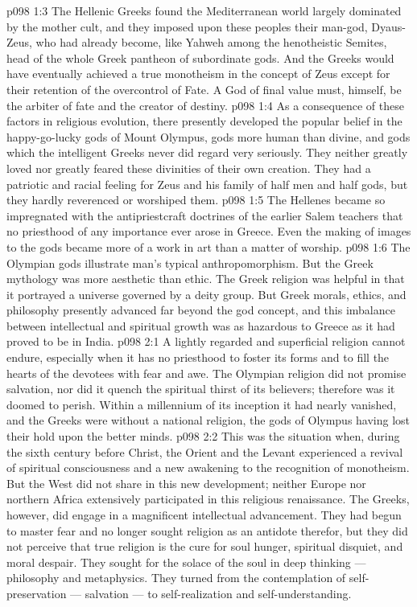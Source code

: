 \vs p098 1:3 The Hellenic Greeks found the Mediterranean world largely dominated by the mother cult, and they imposed upon these peoples their man\hyp{}god, Dyaus\hyp{}Zeus, who had already become, like Yahweh among the henotheistic Semites, head of the whole Greek pantheon of subordinate gods. And the Greeks would have eventually achieved a true monotheism in the concept of Zeus except for their retention of the overcontrol of Fate. A God of final value must, himself, be the arbiter of fate and the creator of destiny.
\vs p098 1:4 As a consequence of these factors in religious evolution, there presently developed the popular belief in the happy\hyp{}go\hyp{}lucky gods of Mount Olympus, gods more human than divine, and gods which the intelligent Greeks never did regard very seriously. They neither greatly loved nor greatly feared these divinities of their own creation. They had a patriotic and racial feeling for Zeus and his family of half men and half gods, but they hardly reverenced or worshiped them.
\vs p098 1:5 The Hellenes became so impregnated with the antipriestcraft doctrines of the earlier Salem teachers that no priesthood of any importance ever arose in Greece. Even the making of images to the gods became more of a work in art than a matter of worship.
\vs p098 1:6 The Olympian gods illustrate man’s typical anthropomorphism. But the Greek mythology was more aesthetic than ethic. The Greek religion was helpful in that it portrayed a universe governed by a deity group. But Greek morals, ethics, and philosophy presently advanced far beyond the god concept, and this imbalance between intellectual and spiritual growth was as hazardous to Greece as it had proved to be in India.
\vs p098 2:1 A lightly regarded and superficial religion cannot endure, especially when it has no priesthood to foster its forms and to fill the hearts of the devotees with fear and awe. The Olympian religion did not promise salvation, nor did it quench the spiritual thirst of its believers; therefore was it doomed to perish. Within a millennium of its inception it had nearly vanished, and the Greeks were without a national religion, the gods of Olympus having lost their hold upon the better minds.
\vs p098 2:2 This was the situation when, during the sixth century before Christ, the Orient and the Levant experienced a revival of spiritual consciousness and a new awakening to the recognition of monotheism. But the West did not share in this new development; neither Europe nor northern Africa extensively participated in this religious renaissance. The Greeks, however, did engage in a magnificent intellectual advancement. They had begun to master fear and no longer sought religion as an antidote therefor, but they did not perceive that true religion is the cure for soul hunger, spiritual disquiet, and moral despair. They sought for the solace of the soul in deep thinking --- philosophy and metaphysics. They turned from the contemplation of self\hyp{}preservation --- salvation --- to self\hyp{}realization and self\hyp{}understanding.
